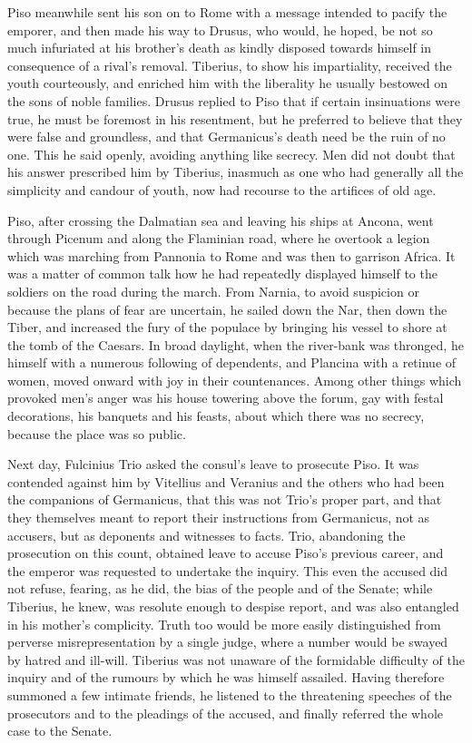 
Piso meanwhile sent his son on to Rome with a message intended to pacify the emporer, and then made his way to Drusus, who would, he hoped, be not so much infuriated at his brother's death as kindly disposed towards himself in consequence of a rival's removal. Tiberius, to show his impartiality, received the youth courteously, and enriched him with the liberality he usually bestowed on the sons of noble families. Drusus replied to Piso that if certain insinuations were true, he must be foremost in his resentment, but he preferred to believe that they were false and groundless, and that Germanicus's death need be the ruin of no one. This he said openly, avoiding anything like secrecy. Men did not doubt that his answer prescribed him by Tiberius, inasmuch as one who had generally all the simplicity and candour of youth, now had recourse to the artifices of old age.


Piso, after crossing the Dalmatian sea and leaving his ships at Ancona, went through Picenum and along the Flaminian road, where he overtook a legion which was marching from Pannonia to Rome and was then to garrison Africa. It was a matter of common talk how he had repeatedly displayed himself to the soldiers on the road during the march. From Narnia, to avoid suspicion or because the plans of fear are uncertain, he sailed down the Nar, then down the Tiber, and increased the fury of the populace by bringing his vessel to shore at the tomb of the Caesars. In broad daylight, when the river-bank was thronged, he himself with a numerous following of dependents, and Plancina with a retinue of women, moved onward with joy in their countenances. Among other things which provoked men's anger was his house towering above the forum, gay with festal decorations, his banquets and his feasts, about which there was no secrecy, because the place was so public.


Next day, Fulcinius Trio asked the consul's leave to prosecute Piso. It was contended against him by Vitellius and Veranius and the others who had been the companions of Germanicus, that this was not Trio's proper part, and that they themselves meant to report their instructions from Germanicus, not as accusers, but as deponents and witnesses to facts. Trio, abandoning the prosecution on this count, obtained leave to accuse Piso's previous career, and the emperor was requested to undertake the inquiry. This even the accused did not refuse, fearing, as he did, the bias of the people and of the Senate; while Tiberius, he knew, was resolute enough to despise report, and was also entangled in his mother's complicity. Truth too would be more easily distinguished from perverse misrepresentation by a single judge, where a number would be swayed by hatred and ill-will. Tiberius was not unaware of the formidable difficulty of the inquiry and of the rumours by which he was himself assailed. Having therefore summoned a few intimate friends, he listened to the threatening speeches of the prosecutors and to the pleadings of the accused, and finally referred the whole case to the Senate.

